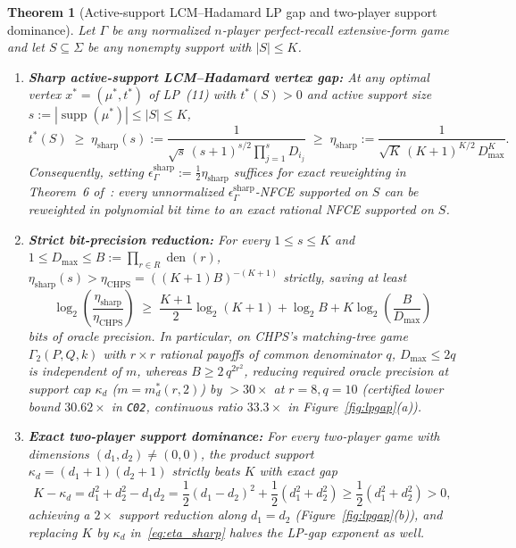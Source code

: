 \documentclass[11pt,a4paper]{article}
\newtheorem{theorem}{Theorem}
\theoremstyle{remark}
\newcommand{\supp}{\operatorname{supp}}
\newcommand{\den}{\operatorname{den}}
\begin{document}
\begin{theorem}[Active-support LCM--Hadamard LP gap and two-player support dominance]\label{thm:lp_gap}
Let $\Gamma$ be any normalized $n$-player perfect-recall extensive-form game and let $S \subseteq \Sigma$ be any nonempty support with $|S| \le K$.
\begin{enumerate}
  \item[\textup{(a)}] \textbf{Sharp active-support LCM--Hadamard vertex gap:} At any optimal vertex $x^* = (\mu^*, t^*)$ of LP~(11) with $t^*(S) > 0$ and active support size $s := |\supp(\mu^*)| \le |S| \le K$,
  \begin{equation}\label{eq:eta_sharp}
    t^*(S) \;\ge\; \eta_{\mathrm{sharp}}(s) := \frac{1}{\sqrt{s}\,(s+1)^{s/2}\prod_{j=1}^{s} D_{i_j}}
    \;\ge\; \eta_{\mathrm{sharp}} := \frac{1}{\sqrt{K}\,(K+1)^{K/2}\,D_{\max}^{K}}.
  \end{equation}
  Consequently, setting $\epsilon_\Gamma^{\mathrm{sharp}} := \frac{1}{2}\eta_{\mathrm{sharp}}$ suffices for exact reweighting in Theorem~6 of~\cite{CHPS2026}: every unnormalized $\epsilon_\Gamma^{\mathrm{sharp}}$-NFCE supported on $S$ can be reweighted in polynomial bit time to an exact rational NFCE supported on $S$.
  \item[\textup{(b)}] \textbf{Strict bit-precision reduction:} For every $1 \le s \le K$ and $1 \le D_{\max} \le B := \prod_{r\in R}\den(r)$, $\eta_{\mathrm{sharp}}(s) > \eta_{\mathrm{CHPS}} = ((K+1)B)^{-(K+1)}$ strictly, saving at least
  \begin{equation}\label{eq:bit_saving}
    \log_2\!\left(\frac{\eta_{\mathrm{sharp}}}{\eta_{\mathrm{CHPS}}}\right)
    \;\ge\; \frac{K+1}{2}\log_2(K+1) + \log_2 B + K\log_2\!\left(\frac{B}{D_{\max}}\right)
  \end{equation}
  bits of oracle precision. In particular, on CHPS's matching-tree game $\Gamma_2(P,Q,k)$ with $r{\times}r$ rational payoffs of common denominator $q$, $D_{\max} \le 2q$ is independent of $m$, whereas $B \ge 2\,q^{2r^2}$, reducing required oracle precision at support cap $\kappa_d$ ($m = m_d^*(r,2)$) by $>30\times$ at $r=8, q=10$ (certified lower bound $30.62\times$ in \texttt{C02}, continuous ratio $33.3\times$ in Figure~\ref{fig:lpgap}(a)).
  \item[\textup{(c)}] \textbf{Exact two-player support dominance:} For every two-player game with dimensions $(d_1,d_2) \neq (0,0)$, the product support $\kappa_d = (d_1+1)(d_2+1)$ strictly beats $K$ with exact gap
  \begin{equation}\label{eq:two_p_gap}
    K - \kappa_d = d_1^2 + d_2^2 - d_1 d_2 = \frac{1}{2}(d_1 - d_2)^2 + \frac{1}{2}(d_1^2 + d_2^2) \ge \frac{1}{2}(d_1^2 + d_2^2) > 0,
  \end{equation}
  achieving a $2\times$ support reduction along $d_1 = d_2$ (Figure~\ref{fig:lpgap}(b)), and replacing $K$ by $\kappa_d$ in~\eqref{eq:eta_sharp} halves the LP-gap exponent as well.
\end{enumerate}
\end{theorem}
\end{document}

